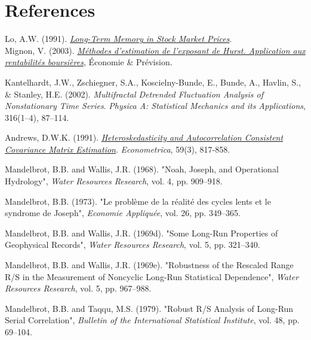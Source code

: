 \documentclass[11pt]{extarticle}
\begin{document}
\FloatBarrier

\section{References}

Lo, A.W. (1991). \textit{\href{http://www.e-m-h.org/Lo\_\_91.pdf}{Long-Term Memory in Stock Market Prices}}. \\

Mignon, V. (2003). \textit{\href{https://www.persee.fr/doc/ecop_0249-4744_1998_num_132_1_5909}{Méthodes d'estimation de l'exposant de Hurst. Application aux rentabilités boursières}}, Économie \& Prévision.

Kantelhardt, J.W., Zschiegner, S.A., Koscielny-Bunde, E., Bunde, A., Havlin, S., \& Stanley, H.E. (2002). \textit{Multifractal Detrended Fluctuation Analysis of Nonstationary Time Series}. \textit{Physica A: Statistical Mechanics and its Applications}, 316(1--4), 87--114.

Andrews, D.W.K. (1991). \textit{\href{https://www.jstor.org/stable/2938229}{Heteroskedasticity and Autocorrelation Consistent Covariance Matrix Estimation}}. \textit{Econometrica}, 59(3), 817-858.

Mandelbrot, B.B. and Wallis, J.R. (1968). "Noah, Joseph, and Operational Hydrology", \textit{Water Resources Research}, vol. 4, pp. 909--918.

Mandelbrot, B.B. (1973). "Le problème de la réalité des cycles lents et le syndrome de Joseph", \textit{Economie Appliquée}, vol. 26, pp. 349--365.

Mandelbrot, B.B. and Wallis, J.R. (1969d). "Some Long-Run Properties of Geophysical Records", \textit{Water Resources Research}, vol. 5, pp. 321--340.

Mandelbrot, B.B. and Wallis, J.R. (1969e). "Robustness of the Rescaled Range R/S in the Measurement of Noncyclic Long-Run Statistical Dependence", \textit{Water Resources Research}, vol. 5, pp. 967--988.

Mandelbrot, B.B. and Taqqu, M.S. (1979). "Robust R/S Analysis of Long-Run Serial Correlation", \textit{Bulletin of the International Statistical Institute}, vol. 48, pp. 69--104.
\end{document}
